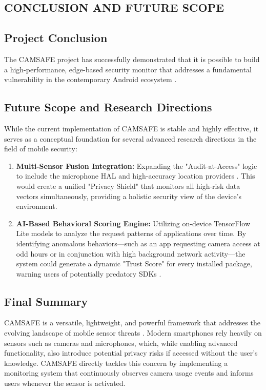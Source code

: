 \documentclass[12pt,a4paper]{report}
\begin{document}
\begin{enumerate}
\begin{itemize}
    \chapter{CONCLUSION AND FUTURE SCOPE}

    \section{Project Conclusion}
    The CAMSAFE project has successfully demonstrated that it is possible to build a high-performance, edge-based security monitor that addresses a fundamental vulnerability in the contemporary Android ecosystem \cite{malwaresurvey}. 


    \section{Future Scope and Research Directions}
    While the current implementation of CAMSAFE is stable and highly effective, it serves as a conceptual foundation for several advanced research directions in the field of mobile security:
    \begin{enumerate}
        \item \textbf{Multi-Sensor Fusion Integration:} Expanding the "Audit-at-Access" logic to include the microphone HAL and high-accuracy location providers \cite{soundcomber}. This would create a unified "Privacy Shield" that monitors all high-risk data vectors simultaneously, providing a holistic security view of the device's environment.
        \item \textbf{AI-Based Behavioral Scoring Engine:} Utilizing on-device TensorFlow Lite models to analyze the request patterns of applications over time. By identifying anomalous behaviors—such as an app requesting camera access at odd hours or in conjunction with high background network activity—the system could generate a dynamic "Trust Score" for every installed package, warning users of potentially predatory SDKs \cite{malwaresurvey}.
    \end{enumerate}

\section{Final Summary}

CAMSAFE is a versatile, lightweight, and powerful framework that addresses the
evolving landscape of mobile sensor threats \cite{malwaresurvey}. Modern
smartphones rely heavily on sensors such as cameras and microphones, which,
while enabling advanced functionality, also introduce potential privacy risks
if accessed without the user's knowledge. CAMSAFE directly tackles this concern
by implementing a monitoring system that continuously observes camera usage
events and informs users whenever the sensor is activated.



\end{itemize}
\end{enumerate}
\end{document}
